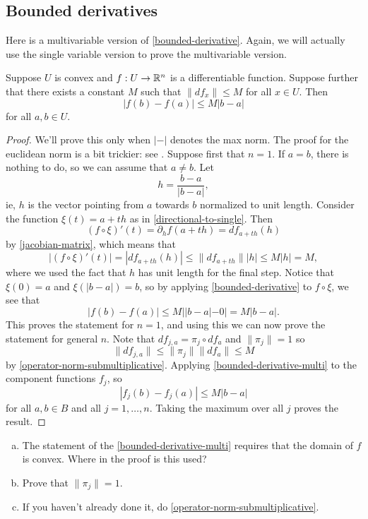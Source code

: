 
\subsection{Bounded derivatives}

Here is a multivariable version of \cref{bounded-derivative}. Again, we will actually use the single variable version to prove the multivariable version. 

\begin{proposition} \label{bounded-derivative-multi}
	Suppose $U$ is convex and $f : U \to \mathbb{R}^n$ is a differentiable function. Suppose further that there exists a constant $M$ such that $\|df_x\| \leq M$ for all $x \in U$. Then
	\[ |f(b) - f(a)| \leq M |b-a| \]
	for all $a, b \in U$. 
\end{proposition}

\begin{proof}
	We'll prove this only when $|-|$ denotes the max norm. The proof for the euclidean norm is a bit trickier: see \cite[theorem 9.19]{rudin}. Suppose first that $n = 1$. If $a = b$, there is nothing to do, so we can assume that $a \neq b$. Let \[ h = \frac{b-a}{|b-a|}, \]
	ie, $h$ is the vector pointing from $a$ towards $b$ normalized to unit length. Consider the function $\xi(t) = a + th$ as in \cref{directional-to-single}. Then
	\[ (f \circ \xi)'(t) = \partial_h f(a + th) = df_{a + th}(h)  \]
	by \cref{jacobian-matrix}, which means that 
	\[ |(f \circ \xi)'(t)| = |df_{a + th}(h)| \leq \|df_{a + th}\| |h| \leq M|h| = M, \]
	where we used the fact that $h$ has unit length for the final step. Notice that $\xi(0) = a$ and $\xi(|b-a|) =  b$, so by applying \cref{bounded-derivative} to $f \circ \xi$, we see that 
	\[ |f(b) - f(a)| \leq M||b-a| - 0| = M|b-a|.  \]
	This proves the statement for $n = 1$, and using this we can now prove the statement for general $n$. Note that $df_{j,a} = \pi_j \circ df_a$ and $\|\pi_j\| = 1$ so \[ \|df_{j,a}\| \leq \|\pi_j\| \|df_a\| \leq M \]
	by \cref{operator-norm-submultiplicative}. Applying \cref{bounded-derivative-multi} to the component functions $f_j$, so 
	\[ |f_j(b) - f_j(a)| \leq M|b-a| \]
	for all $a, b \in B$ and all $j = 1, \dotsc, n$. Taking the maximum over all $j$ proves the result. 
\end{proof}

\begin{exercise}
	\begin{enumerate}[(a)]
		\item The statement of the \cref{bounded-derivative-multi} requires that the domain of $f$ is convex. Where in the proof is this used?
		\item Prove that $\|\pi_j\| = 1$. 
		\item If you haven't already done it, do \cref{operator-norm-submultiplicative}. 
	\end{enumerate} 
\end{exercise}


